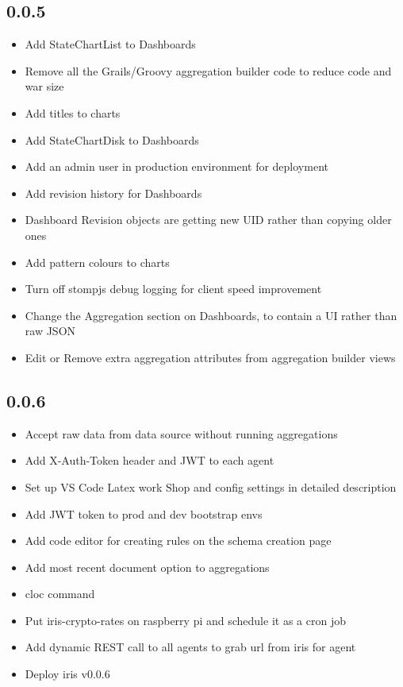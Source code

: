 \documentclass[12pt]{report}
\begin{document}
\subsection*{0.0.5}
\begin{itemize}
\item Add StateChartList to Dashboards
\item Remove all the Grails/Groovy aggregation builder code to reduce code and war size
\item Add titles to charts
\item Add StateChartDisk to Dashboards
\item Add an admin user in production environment for deployment
\item Add revision history for Dashboards
\item Dashboard Revision objects are getting new UID rather than copying older ones
\item Add pattern colours to charts
\item Turn off stompjs debug logging for client speed improvement
\item Change the Aggregation section on Dashboards, to contain a UI rather than raw JSON
\item Edit or Remove extra aggregation attributes from aggregation builder views
\end{itemize}
\subsection*{0.0.6}
\begin{itemize}
\item Accept raw data from data source without running aggregations
\item Add X-Auth-Token header and JWT to each agent
\item Set up VS Code Latex work Shop and config settings in detailed description
\item Add JWT token to prod and dev bootstrap envs
\item Add code editor for creating rules on the schema creation page
\item Add most recent document option to aggregations
\item cloc command
\item Put iris-crypto-rates on raspberry pi and schedule it as a cron job
\item Add dynamic REST call to all agents to grab url  from iris for agent
\item Deploy iris v0.0.6
\end{itemize}
\end{document}
